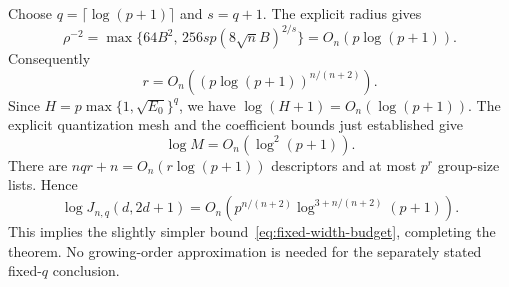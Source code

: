 Choose $q=\lceil\log(p+1)\rceil$ and $s=q+1$. The explicit radius gives
\[
 \rho^{-2}
 =\max\{64B^2,\,256s p(8\sqrt n B)^{2/s}\}
 =O_n(p\log(p+1)).
\]
Consequently
\[
 r=O_n\!\left((p\log(p+1))^{n/(n+2)}\right).
\]
Since $H=p\max\{1,\sqrt{E_0}\}^q$, we have $\log(H+1)=O_n(\log(p+1))$. The explicit quantization mesh and the coefficient bounds just established give
\[
 \log M=O_n(\log^2(p+1)).
\]
There are $nqr+n=O_n(r\log(p+1))$ descriptors and at most $p^r$ group-size lists. Hence
\[
 \log J_{n,q}(d,2d+1)
 =O_n\!\left(p^{n/(n+2)}
                \log^{3+n/(n+2)}(p+1)\right).
\]
This implies the slightly simpler bound~\eqref{eq:fixed-width-budget}, completing the theorem. No growing-order approximation is needed for the separately stated fixed-$q$ conclusion.
